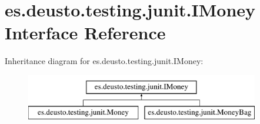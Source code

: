 \hypertarget{interfacees_1_1deusto_1_1testing_1_1junit_1_1_i_money}{}\section{es.\+deusto.\+testing.\+junit.\+I\+Money Interface Reference}
\label{interfacees_1_1deusto_1_1testing_1_1junit_1_1_i_money}
Inheritance diagram for es.\+deusto.\+testing.\+junit.\+I\+Money\+:\begin{figure}[H]
\begin{center}
\leavevmode
\includegraphics[height=2.000000cm]{interfacees_1_1deusto_1_1testing_1_1junit_1_1_i_money}
\end{center}
\end{figure}

